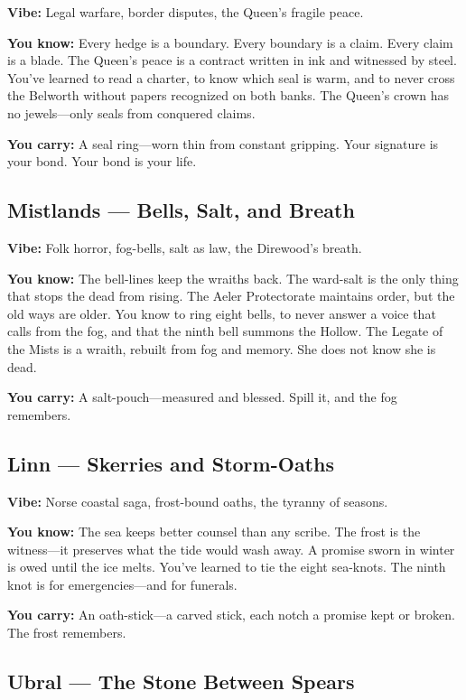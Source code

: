 \documentclass[10pt]{article}
\begin{document}
\textbf{Vibe:} Legal warfare, border disputes, the Queen's fragile peace.

\textbf{You know:} Every hedge is a boundary. Every boundary is a claim. Every claim 
is a blade. The Queen's peace is a contract written in ink and witnessed by steel. 
You've learned to read a charter, to know which seal is warm, and to never cross 
the Belworth without papers recognized on both banks. The Queen's crown has no jewels—only seals from conquered claims.

\textbf{You carry:} A seal ring—worn thin from constant gripping. Your signature 
is your bond. Your bond is your life.

\subsection*{Mistlands --- Bells, Salt, and Breath}

\textbf{Vibe:} Folk horror, fog-bells, salt as law, the Direwood's breath.

\textbf{You know:} The bell-lines keep the wraiths back. The ward-salt is the only 
thing that stops the dead from rising. The Aeler Protectorate maintains order, but 
the old ways are older. You know to ring eight bells, to never answer a voice that 
calls from the fog, and that the ninth bell summons the Hollow. The Legate of the 
Mists is a wraith, rebuilt from fog and memory. She does not know she is dead.

\textbf{You carry:} A salt-pouch—measured and blessed. Spill it, and the fog remembers.

\subsection*{Linn --- Skerries and Storm-Oaths}

\textbf{Vibe:} Norse coastal saga, frost-bound oaths, the tyranny of seasons.

\textbf{You know:} The sea keeps better counsel than any scribe. The frost is the 
witness—it preserves what the tide would wash away. A promise sworn in winter is 
owed until the ice melts. You've learned to tie the eight sea-knots. The ninth 
knot is for emergencies—and for funerals.

\textbf{You carry:} An oath-stick—a carved stick, each notch a promise kept or broken. 
The frost remembers.

\subsection*{Ubral --- The Stone Between Spears}
\end{document}

